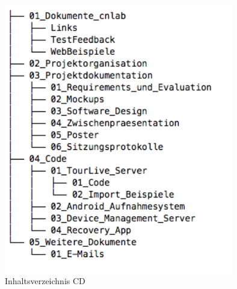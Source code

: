 \begin{figure}[H]
	\centering
	\includegraphics[width=100mm]{images/cd_index.png}
	\caption{Inhaltsverzeichnis CD}
\end{figure}

